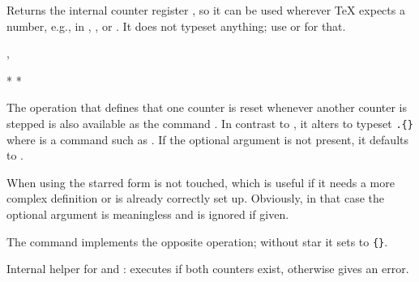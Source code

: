\documentclass{l3in2edoc}
\begin{document}
\begin{function}
  {
    \value
  }
  \begin{syntax}
  \end{syntax}
  Returns the internal counter register , so it can
  be used wherever \TeX{} expects a number, e.g., in
  , , or . It does not
  typeset anything; use  or
   for that.
\end{function}



\begin{function}[user]
  {
    \counterwithin,
    \counterwithout
  }
  \begin{syntax}
     *   
     *   
  \end{syntax}
  The operation that defines that one counter is reset whenever
  another counter is stepped is also available as the command
  . In contrast to , it alters
   to typeset
  \texttt{.}\texttt{\{\}}
  where  is a command such as . If the
  optional argument is not present, it defaults to .

  When using the starred form  is not touched,
  which is useful if it needs a more complex definition or is already
  correctly set up. Obviously, in that case the optional argument is
  meaningless and is ignored if given.

  The  command implements the opposite operation;
  without star it sets  to
  \texttt{\{\}}.
\end{function}


\begin{function}[int]
  {
    \@ifbothcounters
  }
  \begin{syntax}
       
  \end{syntax}
  Internal helper for  and :
  executes  if both counters exist, otherwise gives an
  error.
\end{function}
\end{document}
